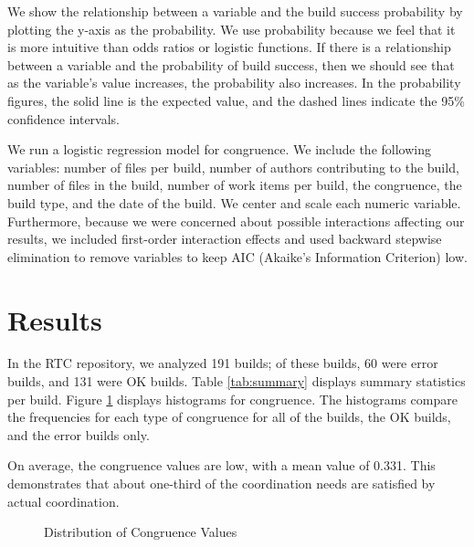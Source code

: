 We show the relationship between a variable and the build success probability by plotting the y-axis as the probability. We use probability because we feel that it is more intuitive than odds ratios or logistic functions. If there is a relationship between a variable and the probability of build success, then we should see that as the variable's value increases, the probability also increases. In the probability figures, the solid line is the expected value, and the dashed lines indicate the 95\% confidence intervals.

We run a logistic regression model for congruence. We include the following variables: number of files per build, number of authors contributing to the build, number of files in the build, number of work items per build, the congruence, the build type, and the date of the build. We center and scale each numeric variable.
Furthermore, because we were concerned about possible interactions affecting our results, we included first-order interaction effects and used backward stepwise elimination to remove variables to keep AIC (Akaike's Information Criterion) low.

\section{Results}
\label{sec:results}
In the RTC repository, we analyzed 191 builds; of these builds, 60 were error builds, and 131 were OK builds. Table \ref{tab:summary} displays summary statistics per build.
Figure \ref{fig:hist_unweighted_congruence} displays histograms for congruence. The histograms compare the frequencies for each type of congruence for all of the builds, the OK builds, and the error builds only.

On average, the congruence values are low, with a mean value of 0.331. This demonstrates that about one-third of the coordination needs are satisfied by actual coordination.
\begin{figure}[t]
  \centering
	\caption{Distribution of Congruence Values}
	\label{fig:hist_unweighted_congruence}
\end{figure}


